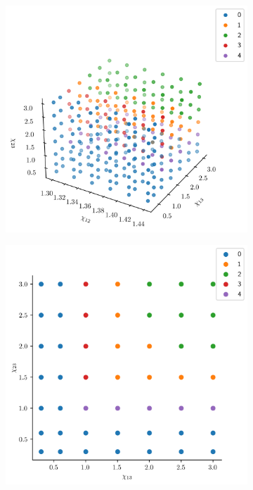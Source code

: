 \begin{figure}[h]
    \centering  
    \begin{subfigure}[b]{0.4\textwidth}
        \centering
        \includegraphics[width=\textwidth]{Chapter-4/figures/result2/result2_Synthetic_DesignSpace.png}
        \caption{}
        \label{fig:synth_designspace_3D}
    \end{subfigure}
    \hfill
    \begin{subfigure}[b]{0.4\textwidth}
        \centering
        \includegraphics[width=\textwidth]{Chapter-4/figures/result2/result2_Synthetic_DesignSpace_2D.png}

\end{subfigure}
\end{figure}
